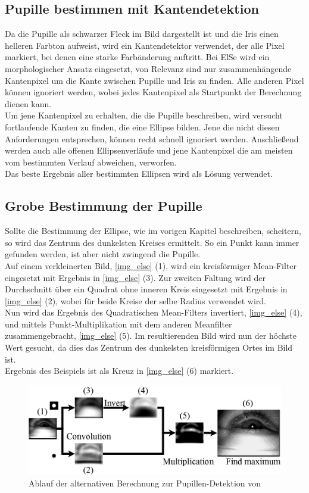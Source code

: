 \subsection{Pupille bestimmen mit Kantendetektion}
Da die Pupille als schwarzer Fleck im Bild dargestellt ist und die Iris einen helleren Farbton aufweist, wird ein Kantendetektor verwendet, der alle Pixel markiert, bei denen eine starke Farbänderung auftritt. Bei ElSe wird ein morphologischer Ansatz eingesetzt, von Relevanz sind nur zusammenhängende Kantenpixel um die Kante zwischen Pupille und Iris zu finden. Alle anderen Pixel können ignoriert werden, wobei jedes Kantenpixel als Startpunkt der Berechnung dienen kann.\\
Um jene Kantenpixel zu erhalten, die die Pupille beschreiben, wird versucht fortlaufende Kanten zu finden, die eine Ellipse bilden. Jene die nicht diesen Anforderungen entsprechen, können recht schnell ignoriert werden. Anschließend werden auch alle offenen Ellipsenverläufe und jene Kantenpixel die am meisten vom bestimmten Verlauf abweichen, verworfen.\\
Das beste Ergebnis aller bestimmten Ellipsen wird als Lösung verwendet.
\subsection{Grobe Bestimmung der Pupille}
\label{ElSe_Grob}
Sollte die Bestimmung der Ellipse, wie im vorigen Kapitel beschreiben, scheitern, so wird das Zentrum des dunkelsten Kreises ermittelt. So ein Punkt kann immer gefunden werden, ist aber nicht zwingend die Pupille.\\
Auf einem verkleinerten Bild, \autoref{img_else} (1), wird ein kreisförmiger Mean-Filter eingesetzt mit Ergebnis in \autoref{img_else} (3). Zur zweiten Faltung wird der Durchschnitt über ein Quadrat ohne inneren Kreis eingesetzt mit Ergebnis in \autoref{img_else} (2), wobei für beide Kreise der selbe Radius verwendet wird.\\
Nun wird das Ergebnis des Quadratischen Mean-Filters invertiert, \autoref{img_else} (4), und mittels Punkt-Multiplikation mit dem anderen Meanfilter zusammengebracht, \autoref{img_else} (5). Im resultierenden Bild wird nun der höchste Wert gesucht, da dies das Zentrum des dunkelsten kreisförmigen Ortes im Bild ist.\\
Ergebnis des Beispiels ist als Kreuz in \autoref{img_else} (6) markiert. 
\begin{figure}
	\centering
	\includegraphics[width=0.8\linewidth]{img/ElSe}
	\caption{Ablauf der alternativen Berechnung zur Pupillen-Detektion von \cite{ElSe}}
	\label{img_else}
\end{figure}